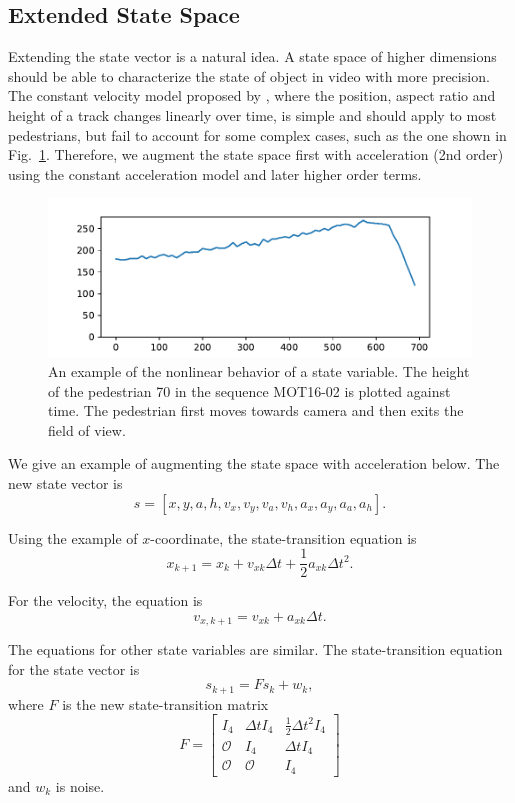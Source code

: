 \documentclass[conference]{IEEEtran}
\begin{document}
\subsection{Extended State Space}

Extending the state vector is a natural idea. A state space of higher dimensions should be able to characterize the state of object in video with more precision. The constant velocity model proposed by \cite{Wojke2017simple}, where the position, aspect ratio and height of a track changes linearly over time, is simple and should apply to most pedestrians, but fail to account for some complex cases, such as the one shown in Fig.~\ref{fig:example-of-nonlinearity}. Therefore, we augment the state space first with acceleration (2nd order) using the constant acceleration model and later higher order terms.

\begin{figure}[t]
    \centering
    \includegraphics[width=\linewidth]{fig/accelerating-pedestrian-height-plot.pdf}
    \caption{An example of the nonlinear behavior of a state variable. The height of the pedestrian 70 in the sequence MOT16-02 is plotted against time. The pedestrian first moves towards camera and then exits the field of view.}
    \label{fig:example-of-nonlinearity}
\end{figure}

We give an example of augmenting the state space with acceleration below. The new state vector is
\[
    s = [x, y, a, h, v_x, v_y, v_a, v_h, a_x, a_y, a_a, a_h].
\]

Using the example of $x$-coordinate, the state-transition equation is
\[
    x_{k + 1} = x_k + v_{xk} \Delta t + \frac{1}{2} a_{xk} \Delta t^2.
\]

For the velocity, the equation is
\[
    v_{x, k + 1} = v_{xk} + a_{xk} \Delta t.
\]

The equations for other state variables are similar. The state-transition equation for the state vector is
\[
    s_{k + 1} = Fs_k + w_k,
\]
where $F$ is the new state-transition matrix
\[
    F = \begin{bmatrix}
        I_4 & \Delta t I_4 & \frac{1}{2} \Delta t^2 I_4\\
        \mathcal{O} & I_4 & \Delta t I_4\\
        \mathcal{O} & \mathcal{O} & I_4
    \end{bmatrix}
\]
and $w_k$ is noise.
\end{document}

